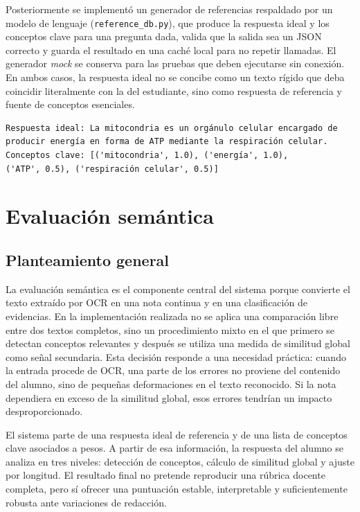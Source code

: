 Posteriormente se implementó un generador de referencias respaldado por un modelo de lenguaje (\texttt{reference\_db.py}), que produce la respuesta ideal y los conceptos clave para una pregunta dada, valida que la salida sea un JSON correcto y guarda el resultado en una caché local para no repetir llamadas. El generador \emph{mock} se conserva para las pruebas que deben ejecutarse sin conexión. En ambos casos, la respuesta ideal no se concibe como un texto rígido que deba coincidir literalmente con la del estudiante, sino como respuesta de referencia y fuente de conceptos esenciales.

\begin{lstlisting}[style=terminal]
Respuesta ideal: La mitocondria es un orgánulo celular encargado de
producir energía en forma de ATP mediante la respiración celular.
Conceptos clave: [('mitocondria', 1.0), ('energía', 1.0),
('ATP', 0.5), ('respiración celular', 0.5)]
\end{lstlisting}

\section{Evaluación semántica}

\subsection{Planteamiento general}

La evaluación semántica es el componente central del sistema porque convierte el texto extraído por OCR en una nota continua y en una clasificación de evidencias. En la implementación realizada no se aplica una comparación libre entre dos textos completos, sino un procedimiento mixto en el que primero se detectan conceptos relevantes y después se utiliza una medida de similitud global como señal secundaria. Esta decisión responde a una necesidad práctica: cuando la entrada procede de OCR, una parte de los errores no proviene del contenido del alumno, sino de pequeñas deformaciones en el texto reconocido. Si la nota dependiera en exceso de la similitud global, esos errores tendrían un impacto desproporcionado.

El sistema parte de una respuesta ideal de referencia y de una lista de conceptos clave asociados a pesos. A partir de esa información, la respuesta del alumno se analiza en tres niveles: detección de conceptos, cálculo de similitud global y ajuste por longitud. El resultado final no pretende reproducir una rúbrica docente completa, pero sí ofrecer una puntuación estable, interpretable y suficientemente robusta ante variaciones de redacción.

